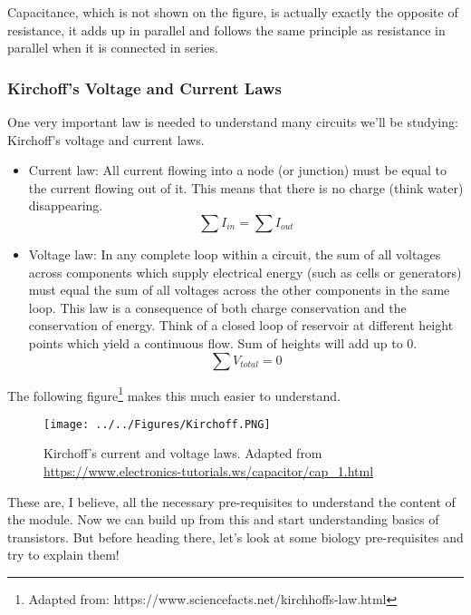 Capacitance, which is not shown on the figure, is actually exactly the opposite of resistance, it adds up in parallel and follows the same principle as resistance in parallel when it is connected in series. 

\subsubsection{Kirchoff's Voltage and Current Laws}

One very important law is needed to understand many circuits we'll be studying: Kirchoff's voltage and current laws. 

\begin{itemize}
    \item Current law: All current flowing into a node (or junction) must be equal to the current flowing out of it. This means that there is no charge (think water) disappearing.
    \begin{equation}
        \sum I_{in} = \sum I_{out}
    \end{equation}
    \item Voltage law: In any complete loop within a circuit, the sum of all voltages across components which supply electrical energy (such as cells or generators) must equal the sum of all voltages across the other components in the same loop. This law is a consequence of both charge conservation and the conservation of energy. Think of a closed loop of reservoir at different height points which yield a continuous flow. Sum of heights will add up to 0.
    \begin{equation}
        \sum V_{total} = 0
    \end{equation}
\end{itemize}

The following figure\footnote{Adapted from: https://www.sciencefacts.net/kirchhoffs-law.html} makes this much easier to understand.  

\begin{figure}[H]
    \centering
    \texttt{[image: ../../Figures/Kirchoff.PNG]}
    \caption{Kirchoff's current and voltage laws. Adapted from \url{https://www.electronics-tutorials.ws/capacitor/cap_1.html}}
    \label{fig:Capacitors}
\end{figure}

These are, I believe, all the necessary pre-requisites to understand the content of the module. Now we can build up from this and start understanding basics of transistors. But before heading there, let's look at some biology pre-requisites and try to explain them!


